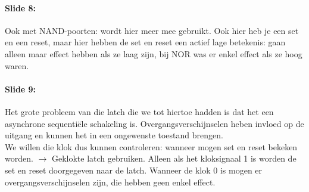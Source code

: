 \documentclass[10pt,a4paper]{book}
\begin{document}
\paragraph{Slide 8:} Ook met NAND-poorten: wordt hier meer mee gebruikt. Ook hier heb je een set en een reset, maar hier hebben de set en reset een actief lage betekenis: gaan alleen maar effect hebben als ze laag zijn, bij NOR was er enkel effect als ze hoog waren. 

\paragraph{Slide 9:} Het grote probleem van die latch die we tot hiertoe hadden is dat het een asynchrone sequenti\"ele schakeling is. Overgangsverschijnselen heben invloed op de uitgang en kunnen het in een ongewenste toestand brengen.\\
We willen die klok dus kunnen controleren: wanneer mogen set en reset bekeken worden. $\rightarrow$ Geklokte latch gebruiken. Alleen als het kloksignaal 1 is worden de set en reset doorgegeven naar de latch. Wanneer de klok 0 is mogen er overgangsverschijnselen zijn, die hebben geen enkel effect.
\end{document}
